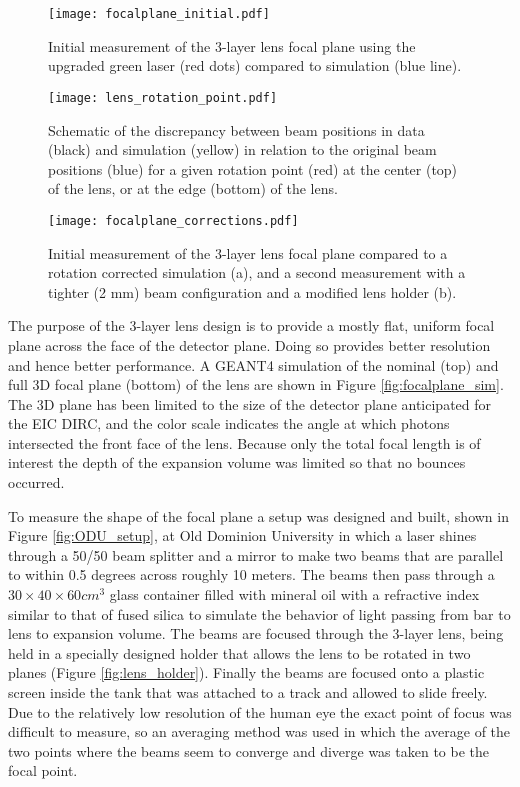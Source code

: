 \begin{figure}[!htb]
	\centering
	\texttt{[image: focalplane\_initial.pdf]}
	\caption{Initial measurement of the 3-layer lens focal plane using the upgraded green laser (red dots) compared to simulation (blue line).}
	\label{fig:focalplane_initial}
\end{figure}

\begin{figure}[!htb]
	\centering
	\texttt{[image: lens\_rotation\_point.pdf]}
	\caption{Schematic of the discrepancy between beam positions in data (black) and simulation (yellow) in relation to the original beam positions (blue) for a given rotation point (red) at the center (top) of the lens, or at the edge (bottom) of the lens. }
	\label{fig:lens_rotation_point}
\end{figure}

\begin{figure}[!htb]
	\centering
	\texttt{[image: focalplane\_corrections.pdf]}
	\caption{Initial measurement of the 3-layer lens focal plane compared to a rotation corrected simulation (a), and a second measurement with a tighter (2 mm) beam configuration and a modified lens holder (b).}
	\label{fig:focalplane_corrections}
\end{figure}

The purpose of the 3-layer lens design is to provide a mostly flat, uniform focal plane across the face of the detector plane. Doing so provides better resolution and hence better performance. A GEANT4 simulation of the nominal (top) and full 3D focal plane (bottom) of the lens are shown in Figure \ref{fig:focalplane_sim}. The 3D plane has been limited to the size of the detector plane anticipated for the EIC DIRC, and the color scale indicates the angle at which photons intersected the front face of the lens. Because only the total focal length is of interest the depth of the expansion volume was limited so that no bounces occurred.

To measure the shape of the focal plane a setup was designed and built, shown in Figure \ref{fig:ODU_setup}, at Old Dominion University in which a laser shines through a 50/50 beam splitter and a mirror to make two beams that are parallel to within 0.5 degrees across roughly 10 meters. The beams then pass through a $30\times40\times60\unit{cm}^3$ glass container filled with mineral oil with a refractive index similar to that of fused silica to simulate the behavior of light passing from bar to lens to expansion volume. The beams are focused through the 3-layer lens, being held in a specially designed holder that allows the lens to be rotated in two planes (Figure \ref{fig:lens_holder}). Finally the beams are focused onto a plastic screen inside the tank that was attached to a track and allowed to slide freely. Due to the relatively low resolution of the human eye the exact point of focus was difficult to measure, so an averaging method was used in which the average of the two points where the beams seem to converge and diverge was taken to be the focal point.

